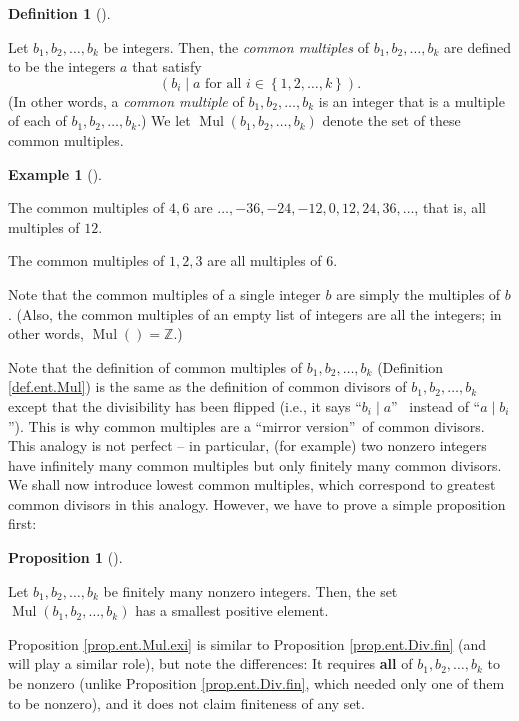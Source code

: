 \documentclass[numbers=enddot,12pt,final,onecolumn,notitlepage]{scrartcl}%
\numberwithin{exer}{subsection}
\theoremstyle{definition}
\newtheorem{prop}[theo]{Proposition}
\newenvironment{proposition}[1][]
{\begin{prop}[#1]\begin{leftbar}}
{\end{leftbar}\end{prop}}
\newtheorem{defi}[theo]{Definition}
\newenvironment{definition}[1][]
{\begin{defi}[#1]\begin{leftbar}}
{\end{leftbar}\end{defi}}
\newtheorem{exam}[theo]{Example}
\newenvironment{example}[1][]
{\begin{exam}[#1]\begin{leftbar}}
{\end{leftbar}\end{exam}}
\begin{document}
\begin{definition}
\label{def.ent.Mul}Let $b_{1},b_{2},\ldots,b_{k}$ be integers. Then, the
\textit{common multiples} of $b_{1},b_{2},\ldots,b_{k}$ are defined to be the
integers $a$ that satisfy%
\[
\left(  b_{i}\mid a\text{ for all }i\in\left\{  1,2,\ldots,k\right\}  \right)
.
\]
(In other words, a \textit{common multiple} of $b_{1},b_{2},\ldots,b_{k}$ is
an integer that is a multiple of each of $b_{1},b_{2},\ldots,b_{k}$.) We let
$\operatorname*{Mul}\left(  b_{1},b_{2},\ldots,b_{k}\right)  $ denote the set
of these common multiples.
\end{definition}

\begin{example}
The common multiples of $4,6$ are $\ldots,-36,-24,-12,0,12,24,36,\ldots$, that
is, all multiples of $12$.

The common multiples of $1,2,3$ are all multiples of $6$.
\end{example}

Note that the common multiples of a single integer $b$ are simply the
multiples of $b$. (Also, the common multiples of an empty list of integers are
all the integers; in other words, $\operatorname*{Mul}\left(  {}\right)
=\mathbb{Z}$.)

Note that the definition of common multiples of $b_{1},b_{2},\ldots,b_{k}$
(Definition \ref{def.ent.Mul}) is the same as the definition of common
divisors of $b_{1},b_{2},\ldots,b_{k}$ except that the divisibility has been
flipped (i.e., it says \textquotedblleft$b_{i}\mid a$\textquotedblright%
\ instead of \textquotedblleft$a\mid b_{i}$\textquotedblright). This is why
common multiples are a \textquotedblleft mirror version\textquotedblright\ of
common divisors. This analogy is not perfect -- in particular, (for example)
two nonzero integers have infinitely many common multiples but only finitely
many common divisors. We shall now introduce lowest common multiples, which
correspond to greatest common divisors in this analogy. However, we have to
prove a simple proposition first:

\begin{proposition}
\label{prop.ent.Mul.exi}Let $b_{1},b_{2},\ldots,b_{k}$ be finitely many
nonzero integers. Then, the set $\operatorname*{Mul}\left(  b_{1},b_{2}%
,\ldots,b_{k}\right)  $ has a smallest positive element.
\end{proposition}

Proposition \ref{prop.ent.Mul.exi} is similar to Proposition
\ref{prop.ent.Div.fin} (and will play a similar role), but note the
differences: It requires \textbf{all} of $b_{1},b_{2},\ldots,b_{k}$ to be
nonzero (unlike Proposition \ref{prop.ent.Div.fin}, which needed only one of
them to be nonzero), and it does not claim finiteness of any set.
\end{document}
